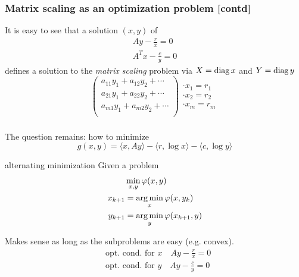 \documentclass{beamer}
\begin{document}
\begin{frame}
  \frametitle{Matrix scaling as an optimization problem [contd]}
  It is easy to see that a solution $(x,y)$ of
  \begin{equation}
    \begin{aligned}
      Ay - \frac{r}{x} = 0 \\
      A^T x - \frac{c}{y} = 0
    \end{aligned}
  \end{equation}
  defines a solution to the \emph{matrix scaling} problem via $X=\operatorname*{diag} x$ and $Y=\operatorname*{diag} y$
  \begin{equation}
    \left(\begin{array}{c}
            a_{1 1} y_1 + a_{1 2} y_2 + \cdots \\
            a_{2 1} y_1 + a_{2 2} y_2 + \cdots \\
            a_{m 1} y_1 + a_{m 2} y_2 + \cdots \\
          \end{array}\right)
        \begin{array}{c}
          \cdot x_1 = r_1\\
          \cdot x_2 = r_2\\
          \cdot x_m = r_m
        \end{array}
      \end{equation}
\end{frame}

\begin{frame}
  \frametitle{}
  The question remains: how to minimize
  \begin{equation}
    g(x,y) = \langle x, A y \rangle - \langle r, \log x \rangle - \langle c, \log y \rangle
  \end{equation}
    \begin{block}{alternating minimization}
      Given a problem
      \begin{equation}
        \begin{aligned}
          &\min_{x,y} \varphi(x,y)\\
          x_{k+1} &= \operatorname*{arg\,min}_x \varphi(x,y_k) \\
          y_{k+1} &= \operatorname*{arg\,min}_y \varphi(x_{k+1}, y)
        \end{aligned}
      \end{equation}
    \end{block}
    Makes sense as long as the subproblems are easy (e.g. convex).
  \begin{align}
    &\text{opt. cond.\ for $x$} \quad Ay - \frac{r}{x} = 0 \\
    &\text{opt. cond.\ for $y$} \quad Ay - \frac{c}{y} = 0
  \end{align}
\end{frame}
\end{document}
